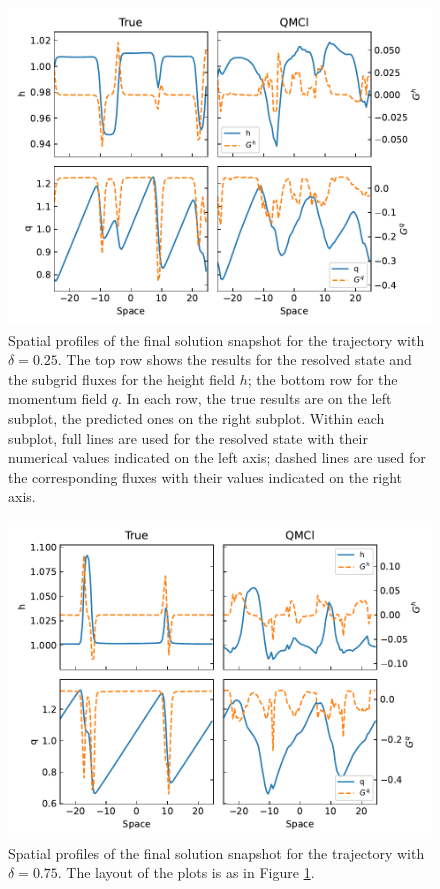 \documentclass[letterpaper,10pt,3p,preprint]{elsarticle}
\begin{document}
\begin{figure}[t]
    \centering
    \includegraphics[width=.7\textwidth]{res01b.pdf}
    \caption{Spatial profiles of the final solution snapshot
    for the trajectory with $\delta=0.25$.
    The top row shows the results for the resolved state and the
    subgrid fluxes for the height field $h$;
    the bottom row for the momentum field $q$.
    In each row, the true results are on the left subplot,
    the predicted ones on the right subplot.
    Within each subplot, full lines are used for the resolved state
    with their numerical values indicated on the left axis;
    dashed lines are used for the corresponding fluxes with their
    values indicated on the right axis.}
    \label{fig:res01b}
\end{figure}

\begin{figure}[t]
    \centering
    \includegraphics[width=.7\textwidth]{res02b.pdf}
    \caption{Spatial profiles of the final solution snapshot
    for the trajectory with $\delta=0.75$.
    The layout of the plots is as in Figure \ref{fig:res01b}.}
    \label{fig:res02b}
\end{figure}
\end{document}
